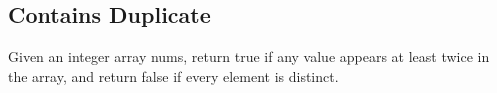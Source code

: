 \subsection{Contains Duplicate}\label{subsec:contains-duplicate}
Given an integer array nums, return true if any value appears at least twice in the array,
and return false if every element is distinct.
